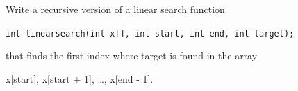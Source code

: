 Write a recursive version of a linear search function



\verb!int linearsearch(int x[], int start, int end, int target);!



that finds the first index where target is found in the array

x[start], x[start + 1], \ldots, x[end - 1].

